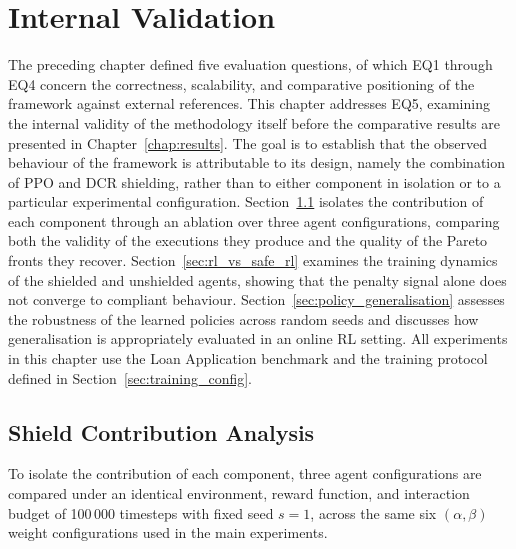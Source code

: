 
\chapter{Internal Validation}
\label{chap:internal_validation}

The preceding chapter defined five evaluation questions, of which EQ1
through EQ4 concern the correctness, scalability, and comparative
positioning of the framework against external references. This chapter
addresses EQ5, examining the internal validity of the methodology itself
before the comparative results are presented in
Chapter~\ref{chap:results}. The goal is to establish that the observed
behaviour of the framework is attributable to its design, namely the
combination of \ac{PPO} and \ac{DCR} shielding, rather than to either
component in isolation or to a particular experimental configuration.
Section~\ref{sec:shield_contribution} isolates the contribution of each
component through an ablation over three agent configurations, comparing
both the validity of the executions they produce and the quality of the
Pareto fronts they recover. Section~\ref{sec:rl_vs_safe_rl} examines the
training dynamics of the shielded and unshielded agents, showing that
the penalty signal alone does not converge to compliant behaviour.
Section~\ref{sec:policy_generalisation} assesses the robustness of the
learned policies across random seeds and discusses how generalisation is
appropriately evaluated in an online \ac{RL} setting. All experiments in
this chapter use the Loan Application benchmark and the training
protocol defined in Section~\ref{sec:training_config}.

\section{Shield Contribution Analysis}
\label{sec:shield_contribution}

To isolate the contribution of each component, three agent
configurations are compared under an identical environment, reward
function, and interaction budget of 100\,000 timesteps with fixed seed
$s=1$, across the same six $(\alpha,\beta)$ weight configurations used
in the main experiments.

